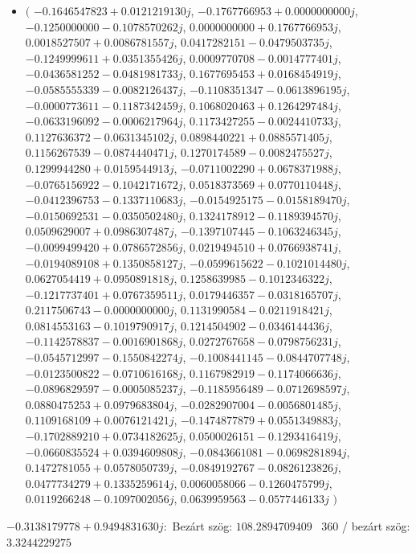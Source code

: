 \documentclass[14pt,a4paper]{article}
\begin{document}
\begin{itemize}
\item
$\big($
$-0.1646547823+0.0121219130j$, $-0.1767766953+0.0000000000j$, $-0.1250000000-0.1078570262j$, $0.0000000000+0.1767766953j$, $0.0018527507+0.0086781557j$, $0.0417282151-0.0479503735j$, $-0.1249999611+0.0351355426j$, $0.0009770708-0.0014777401j$, $-0.0436581252-0.0481981733j$, $0.1677695453+0.0168454919j$, $-0.0585555339-0.0082126437j$, $-0.1108351347-0.0613896195j$, $-0.0000773611-0.1187342459j$, $0.1068020463+0.1264297484j$, $-0.0633196092-0.0006217964j$, $0.1173427255-0.0024410733j$, $0.1127636372-0.0631345102j$, $0.0898440221+0.0885571405j$, $0.1156267539-0.0874440471j$, $0.1270174589-0.0082475527j$, $0.1299944280+0.0159544913j$, $-0.0711002290+0.0678371988j$, $-0.0765156922-0.1042171672j$, $0.0518373569+0.0770110448j$, $-0.0412396753-0.1337110683j$, $-0.0154925175-0.0158189470j$, $-0.0150692531-0.0350502480j$, $0.1324178912-0.1189394570j$, $0.0509629007+0.0986307487j$, $-0.1397107445-0.1063246345j$, $-0.0099499420+0.0786572856j$, $0.0219494510+0.0766938741j$, $-0.0194089108+0.1350858127j$, $-0.0599615622-0.1021014480j$, $0.0627054419+0.0950891818j$, $0.1258639985-0.1012346322j$, $-0.1217737401+0.0767359511j$, $0.0179446357-0.0318165707j$, $0.2117506743-0.0000000000j$, $0.1131990584-0.0211918421j$, $0.0814553163-0.1019790917j$, $0.1214504902-0.0346144436j$, $-0.1142578837-0.0016901868j$, $0.0272767658-0.0798756231j$, $-0.0545712997-0.1550842274j$, $-0.1008441145-0.0844707748j$, $-0.0123500822-0.0710616168j$, $0.1167982919-0.1174066636j$, $-0.0896829597-0.0005085237j$, $-0.1185956489-0.0712698597j$, $0.0880475253+0.0979683804j$, $-0.0282907004-0.0056801485j$, $0.1109168109+0.0076121421j$, $-0.1474877879+0.0551349883j$, $-0.1702889210+0.0734182625j$, $0.0500026151-0.1293416419j$, $-0.0660835524+0.0394609808j$, $-0.0843661081-0.0698281894j$, $0.1472781055+0.0578050739j$, $-0.0849192767-0.0826123826j$, $0.0477734279+0.1335259614j$, $0.0060058066-0.1260475799j$, $0.0119266248-0.1097002056j$, $0.0639959563-0.0577446133j$
$\big)$
\end{itemize}
$-0.3138179778+0.9494831630j$:\
Bezárt szög: $108.2894709409$ \
360 / bezárt szög: $3.3244229275$\
\end{document}
